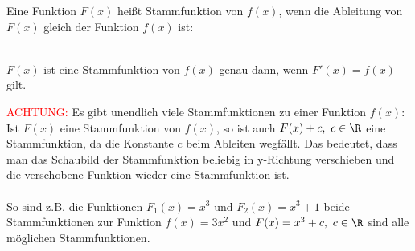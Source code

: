 Eine Funktion \(F(x)\) heißt Stammfunktion von \(f(x)\), wenn die Ableitung von \(F(x)\) gleich der Funktion \(f(x)\) ist:
\begin{tcolorbox}
	\phantom{A}\\
	\textcolor{loestc}{\(F(x)\) ist eine Stammfunktion von \(f(x)\) genau dann, wenn \(F'(x)=f(x)\) gilt.}\\
\end{tcolorbox}
\textcolor{red}{ACHTUNG:} Es gibt unendlich viele Stammfunktionen zu einer Funktion \(f(x)\):\\
\textcolor{loes}{Ist \(F(x)\) eine Stammfunktion von \(f(x)\), so ist auch \(F(x)+c,\ c\in\R\) eine Stammfunktion, da die Konstante \(c\) beim Ableiten wegfällt. Das bedeutet, dass man das Schaubild der Stammfunktion beliebig in y-Richtung verschieben und die verschobene Funktion wieder eine Stammfunktion ist.}\\ \\
So sind z.B. die Funktionen \(F_1(x)=x^3\) und \(F_2(x)=x^3+1\) beide Stammfunktionen zur Funktion \(f(x)=3x^2\) und \(F(x)=x^3+c,\ c\in\R\) sind alle möglichen Stammfunktionen.\\

